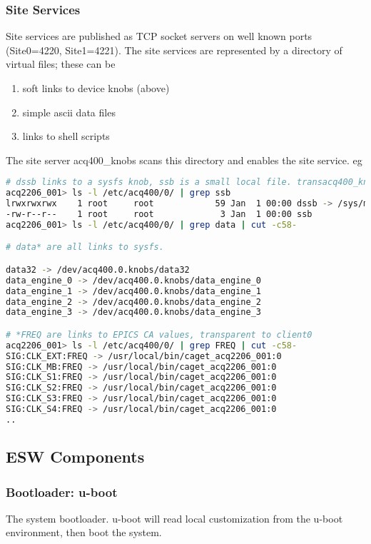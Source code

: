 \documentclass[]{article}
\begin{document}
\subsubsection{Site Services}
Site services are published as TCP socket servers on well known ports (Site0=4220, Site1=4221).
The site services are represented by a directory of virtual files; these can be
\begin{enumerate}
	\item soft links to device knobs (above)
	\item simple ascii data files
	\item links to shell scripts
\end{enumerate} 
The site server acq400_knobs scans this directory and enables the site service.
eg
\begin{lstlisting}[language=bash,style=bashstyle,frame=single]
# dssb links to a sysfs knob, ssb is a small local file. transacq400_knobs clients are unaware..
acq2206_001> ls -l /etc/acq400/0/ | grep ssb 
lrwxrwxrwx    1 root     root            59 Jan  1 00:00 dssb -> /sys/module/acq420fmc/parameters/xo_distributor_sample_size
-rw-r--r--    1 root     root             3 Jan  1 00:00 ssb
acq2206_001> ls -l /etc/acq400/0/ | grep data | cut -c58-

# data* are all links to sysfs.

data32 -> /dev/acq400.0.knobs/data32
data_engine_0 -> /dev/acq400.0.knobs/data_engine_0
data_engine_1 -> /dev/acq400.0.knobs/data_engine_1
data_engine_2 -> /dev/acq400.0.knobs/data_engine_2
data_engine_3 -> /dev/acq400.0.knobs/data_engine_3

# *FREQ are links to EPICS CA values, transparent to client0
acq2206_001> ls -l /etc/acq400/0/ | grep FREQ | cut -c58-
SIG:CLK_EXT:FREQ -> /usr/local/bin/caget_acq2206_001:0
SIG:CLK_MB:FREQ -> /usr/local/bin/caget_acq2206_001:0
SIG:CLK_S1:FREQ -> /usr/local/bin/caget_acq2206_001:0
SIG:CLK_S2:FREQ -> /usr/local/bin/caget_acq2206_001:0
SIG:CLK_S3:FREQ -> /usr/local/bin/caget_acq2206_001:0
SIG:CLK_S4:FREQ -> /usr/local/bin/caget_acq2206_001:0
..
\end{lstlisting}


\subsection{ESW Components}

\subsubsection{Bootloader: u-boot}
The system bootloader. u-boot will read local customization from the u-boot environment, then boot the system.
\end{document}
